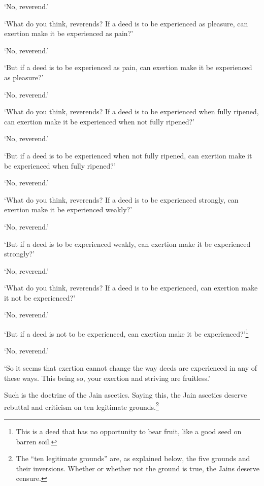 \documentclass[12pt,openany]{book}%
\begin{document}
‘No, reverend.’ 

‘What do you think, reverends? If a deed is to be experienced as pleasure, can exertion make it be experienced as pain?’ 

‘No, reverend.’ 

‘But if a deed is to be experienced as pain, can exertion make it be experienced as pleasure?’ 

‘No, reverend.’ 

‘What do you think, reverends? If a deed is to be experienced when fully ripened, can exertion make it be experienced when not fully ripened?’ 

‘No, reverend.’ 

‘But if a deed is to be experienced when not fully ripened, can exertion make it be experienced when fully ripened?’ 

‘No, reverend.’ 

‘What do you think, reverends? If a deed is to be experienced strongly, can exertion make it be experienced weakly?’ 

‘No, reverend.’ 

‘But if a deed is to be experienced weakly, can exertion make it be experienced strongly?’ 

‘No, reverend.’ 

‘What do you think, reverends? If a deed is to be experienced, can exertion make it not be experienced?’ 

‘No, reverend.’ 

‘But if a deed is not to be experienced, can exertion make it be experienced?’\footnote{This is a deed that has no opportunity to bear fruit, like a good seed on barren soil. } 

‘No, reverend.’ 

‘So it seems that exertion cannot change the way deeds are experienced in any of these ways. This being so, your exertion and striving are fruitless.’ 

Such is the doctrine of the Jain ascetics. Saying this, the Jain ascetics deserve rebuttal and criticism on ten legitimate grounds.\footnote{The “ten legitimate grounds” are, as explained below, the five grounds and their inversions. Whether or whether not the ground is true, the Jains deserve censure. } 
\end{document}
